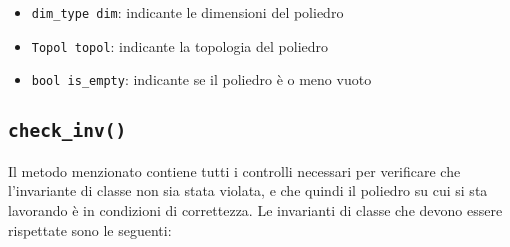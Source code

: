 \documentclass{mimosis}
\theoremstyle{definition}
\begin{document}
\begin{itemize}
\item \texttt{dim\_type dim}: indicante le dimensioni del poliedro
\item \texttt{Topol topol}: indicante la topologia del poliedro
\item \texttt{bool is\_empty}: indicante se il poliedro è o meno vuoto
\end{itemize}
\subsection{\texttt{check\_inv()}}
\label{sec:orgdb9834e}
Il metodo menzionato contiene tutti i controlli necessari per verificare che
l'invariante di classe non sia stata violata, e che quindi il poliedro su cui si
sta lavorando è in condizioni di correttezza. Le invarianti di classe che devono
essere rispettate sono le seguenti:
\end{document}
